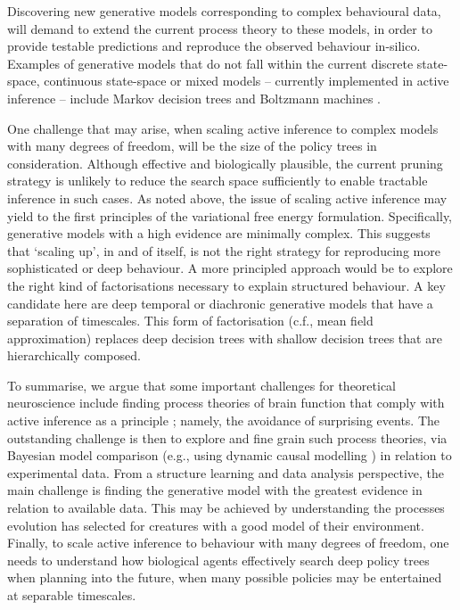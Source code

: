 \documentclass{article}
\begin{document}
Discovering new generative models corresponding to complex behavioural data, will demand to extend the current process theory to these models, in order to provide testable predictions and reproduce the observed behaviour in-silico. Examples of generative models that do not fall within the current discrete state-space, continuous state-space \cite{buckleyFreeEnergyPrinciple2017,fristonActiveInferenceAgency2012,adamsComputationalAnatomyPsychosis2013,brownActiveInferenceSensory2013,adamsPredictionsNotCommands2013,fristonPerceptionsHypothesesSaccades2012,brownFreeEnergyIllusionsCornsweet2012} or mixed \cite{fristonGraphicalBrainBelief2017,parrDiscreteContinuousBrain2018,parrComputationalPharmacologyOculomotion2019} models – currently implemented in active inference – include Markov decision trees \cite{jordanIntroductionVariationalMethods1998,jordanHiddenMarkovDecision1997} and Boltzmann machines \cite{stoneArtificialIntelligenceEngines2019,ackleyLearningAlgorithmBoltzmann1985,salakhutdinovEfficientLearningProcedure2012}.

One challenge that may arise, when scaling active inference to complex models with many degrees of freedom, will be the size of the policy trees in consideration. Although effective and biologically plausible, the current pruning strategy is unlikely to reduce the search space sufficiently to enable tractable inference in such cases. As noted above, the issue of scaling active inference may yield to the first principles of the variational free energy formulation. Specifically, generative models with a high evidence are minimally complex. This suggests that ‘scaling up’, in and of itself, is not the right strategy for reproducing more sophisticated or deep behaviour. A more principled approach would be to explore the right kind of factorisations necessary to explain structured behaviour. A key candidate here are deep temporal or diachronic generative models that have a separation of timescales. This form of factorisation (c.f., mean field approximation) replaces deep decision trees with shallow decision trees that are hierarchically composed.

To summarise, we argue that some important challenges for theoretical neuroscience include finding process theories of brain function that comply with active inference as a principle \cite{parrMarkovBlanketsInformation2019,fristonFreeEnergyPrinciple2019}; namely, the avoidance of surprising events. The outstanding challenge is then to explore and fine grain such process theories, via Bayesian model comparison (e.g., using dynamic causal modelling \cite{fristonDynamicCausalModelling2003,fristonHistoryFutureBayesian2012}) in relation to experimental data. From a structure learning and data analysis perspective, the main challenge is finding the generative model with the greatest evidence in relation to available data. This may be achieved by understanding the processes evolution has selected for creatures with a good model of their environment. Finally, to scale active inference to behaviour with many degrees of freedom, one needs to understand how biological agents effectively search deep policy trees when planning into the future, when many possible policies may be entertained at separable timescales.
\end{document}
